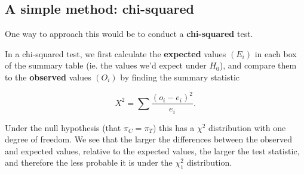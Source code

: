 \documentclass[
  openany]{book}
\theoremstyle{definition}
\theoremstyle{definition}
\theoremstyle{definition}
\theoremstyle{definition}
\theoremstyle{remark}
\begin{document}
\subsection{A simple method: chi-squared}\label{a-simple-method-chi-squared}

One way to approach this would be to conduct a \textbf{chi-squared} test.

In a chi-squared test, we first calculate the \textbf{expected} values \(\left(E_i\right)\) in each box of the summary table (ie. the values we'd expect under \(H_0\)), and compare them to the \textbf{observed} values \(\left(O_i\right)\) by finding the summary statistic

\[ X^2 = \sum \frac{\left(o_i - e_i\right)^2}{e_i}.\]

Under the null hypothesis (that \(\pi_C = \pi_T\)) this has a \(\chi^2\) distribution with one degree of freedom. We see that the larger the differences between the observed and expected values, relative to the expected values, the larger the test statistic, and therefore the less probable it is under the \(\chi^2_1\) distribution.
\end{document}
